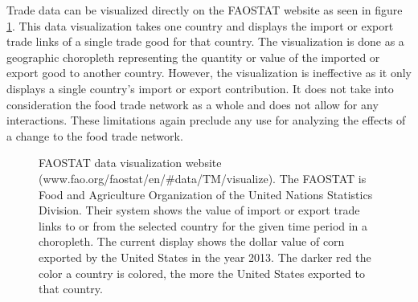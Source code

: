 Trade data can be visualized directly on the FAOSTAT website as seen in figure \ref{faostatViz}. This data visualization takes one country and displays the import or export trade links of a single trade good for that country. The visualization is done as a geographic choropleth representing the quantity or value of the imported or export good to another country. However, the visualization is ineffective as it only displays a single country's import or export contribution. It does not take into consideration the food trade network as a whole and does not allow for any interactions. These limitations again preclude any use for analyzing the effects of a change to the food trade network.\par
\begin{figure}[htb]
	\caption[FAOSTAT DATA VISUALIZATION WEBSITE]{FAOSTAT data visualization website (www.fao.org/faostat/en/\#data/TM/visualize). The FAOSTAT is Food and Agriculture Organization of the United Nations Statistics Division. Their system shows the value of import or export trade links to or from the selected country for the given time period in a choropleth. The current display shows the dollar value of corn exported by the United States in the year 2013. The darker red the color a country is colored, the more the United States exported to that country. }
	\label{faostatViz}
\end{figure}

